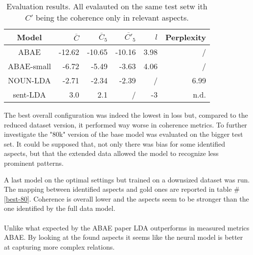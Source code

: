 \begin{center}
    \begin{table}
        \begin{tabular}{c r r r r r}
            \hline
            Model      & $\overline{C}$ & $\overline{C}_5$ & $\overline{C'}_5$ & $l$  & Perplexity\\ [0.5ex]
            \hline
            ABAE       & -12.62         & -10.65           & -10.16            & 3.98 & /          \\
            \hline
            ABAE-small & -6.72          & -5.49            & -3.63             & 4.06 & /          \\
            \hline %
            NOUN-LDA   & -2.71          & -2.34            & -2.39             & /    & 6.99       \\
            \hline  %
            sent-LDA   & 3.0            & 2.1              & /                 & -3   & n.d.       \\
            \hline
        \end{tabular}
        \caption{Evaluation results. All evalauted on the same test setw ith $C'$ being the coherence only in relevant aspects.
        }
        \label{performance-review}

    \end{table}

\end{center}

The best overall configuration was indeed the lowest in loss but, compared to the reduced
dataset version, it performed way worse in coherence metrics.
To further investigate the "80k" version of the base model was evaluated on the bigger test set.
It could be supposed that, not only there was bias for some identified aspects, but that the extended
data allowed the model to recognize less prominent patterns.

A last model on the optimal settings but trained on a downsized dataset was run.
The mapping between identified aspects and gold ones are reported in table \#\ref{best-80}.
Coherence is overall lower and the aspects seem to be stronger than the one identified by the full data model.

\paragraph{}
Unlike what expected by the ABAE paper LDA outperforms in measured metrics ABAE.
By looking at the found aspects it seems like the neural model is better at capturing more complex relations.

